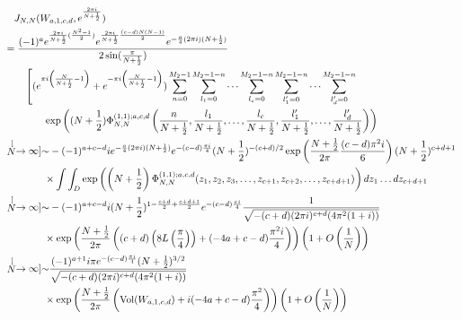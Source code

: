 \documentclass[10pt,a4paper]{article}
\newcommand{\lt}{\left}
\newcommand{\rt}{\right}
\def\Vol{\operatorname{Vol}}
\def\Vol{\operatorname{Vol}}
\begin{document}
\iffalse
\begin{align}
&\quad J_{N, N} (W_{a,1,c,d}, e^{\frac{2\pi i}{N+\frac{1}{2}}}) \notag  \\
&=   \frac{(-1)^{a }  e^{\frac{2\pi i}{N+\frac{1}{2}}( \frac{N^2-1}{2})}e^{\frac{2\pi i}{N+\frac{1}{2}}\frac{(c-d)N(N-1)}{2}}  e^{- \frac{a}{4}(2\pi i)(N+\frac{1}{2})} }{2\sin(\frac{\pi}{N+\frac{1}{2}})} \notag \\
&\qquad  \lt[(e^{\pi i \lt(\frac{N}{N+\frac{1}{2}} - 1\rt) }+ e^{-\pi i \lt(\frac{N}{N+\frac{1}{2}} - 1\rt) }) \sum_{n=0}^{M_2-1} \sum_{l_1=0}^{M_2-1-n}\dots \sum_{l_c=0}^{M_2-1-n} \sum_{l_1'=0}^{M_2-1-n}\dots \sum_{l_d'=0}^{M_2-1-n}  \rt. \notag \\
&\qquad\qquad \exp\lt( (N+\frac{1}{2})\Phi^{(1,1);a,c,d}_{N,N} \lt(\frac{n}{N+\frac{1}{2}},\frac{l_1}{N+\frac{1}{2}}, \dots, \frac{l_c}{N+\frac{1}{2}}, \frac{l_1'}{N+\frac{1}{2}} ,\dots, \frac{l_d'}{N+\frac{1}{2}} \rt) \rt)  \notag \\
&\stackrel[N \to \infty]{\sim}{}  -(-1)^{a+c-d}i  e^{- \frac{a}{4}(2\pi i)(N+\frac{1}{2})}e^{-(c-d)\frac{\pi i}{4}}(N+\frac{1}{2})^{-(c+d)/2}\exp\lt( \frac{N+\frac{1}{2}}{2\pi } \frac{(c-d)\pi^2 i}{6} \rt) (N+\frac{1}{2})^{c+d+1}\notag\\
&\qquad\qquad\times \int\int_D  \exp \lt( \lt(N+\frac{1}{2}\rt) \Phi^{(1,1);a,c,d}_{N,N}  (z_1, z_2,z_3, \dots, z_{c+1}, z_{c+2},\dots, z_{c+d+1}) \rt) dz_1 \dots dz_{c+d+1} \notag \\
&\stackrel[N \to \infty]{\sim}{}  -(-1)^{a+c-d} i (N+\frac{1}{2})^{1-\frac{c+d}{2}+\frac{c+d+1}{2}}e^{-(c-d)\frac{\pi i}{4}} \frac{1}{\sqrt{ -(c+d) (2\pi i)^{c+d} (4\pi^2 (1+i))}}  \notag\\
&\qquad\qquad\times\exp\lt(  \frac{N+\frac{1}{2}}{2\pi} \lt((c+d)\lt(8L\lt(\frac{\pi}{4}\rt)\rt) + (-4a + c-d)\frac{\pi^2 i}{4}\rt)\rt) \lt(1 + O\lt(\frac{1}{N}\rt) \rt)  \notag \\ 
&\stackrel[N \to \infty]{\sim}{}  \frac{(-1)^{a+1}i\pi e^{-(c-d)\frac{\pi i}{4}}(N+\frac{1}{2})^{3/2}}{\sqrt{-(c+d) (2\pi i)^{c+d} (4\pi^2 (1+i))}} \notag \\
&\qquad \qquad\times\exp\lt( \frac{N+\frac{1}{2}}{2\pi }  \lt(\Vol(W_{a,1,c,d}) + i(-4a+c-d)\frac{\pi^2}{4} \rt)  \rt) \lt(1 + O\lt(\frac{1}{N}\rt) \rt)
\end{align}
\end{document}

